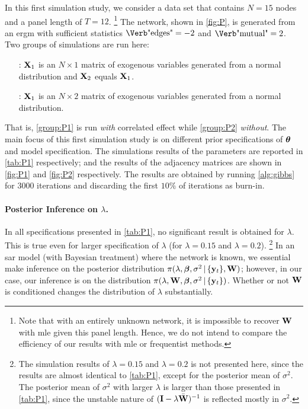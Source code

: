 \documentclass[a4paper]{article}
\begin{document}
In this first simulation study,
we consider a data set that contains $N=15$ nodes and a panel length of $T=12$.
\footnote{
	Note that with an entirely unknown network,
	it is impossible to recover $\mathbf{W}$ with \gls{mle} given this panel length.
	Hence, we do not intend to compare the efficiency of our results with \gls{mle} or frequentist methods.
}
The network, shown in \autoref{fig:P},
is generated from an \gls{ergm}
with sufficient statistics $\text{\Verb"edges"}=-2$ and $\text{\Verb"mutual"}=2$.
Two groups of simulations are run here:
\begin{itemize}[leftmargin=]
	\item[\itemlabel{group:P1}{Group P1}:]
		$\mathbf{X}_1$ is an $N\times 1$ matrix of exogenous variables generated from a normal distribution and $\mathbf{X}_{2}$ equals $\mathbf{X}_{1}$.
	\item[\itemlabel{group:P2}{Group P2}:]
		$\mathbf{X}_1$ is an $N\times 2$ matrix of exogenous variables generated from a normal distribution.
\end{itemize}
That is, \ref{group:P1} is run \emph{with} correlated effect while \ref{group:P2} \emph{without}.
The main focus of this first simulation study is on different prior specifications of $\boldsymbol{\theta}$ and model specification.
The simulations results of the parameters are reported in \autoref{tab:P1} respectively;
and the results of the adjacency matrices are shown in \autoref{fig:P1} and \autoref{fig:P2} respectively.
The results are obtained by running \autoref{alg:gibbs} for $3000$ iterations and discarding the first $10\%$ of iterations as burn-in.

\paragraph{Posterior Inference on $\lambda$.}

In all specifications presented in \autoref{tab:P1},
no significant result is obtained for $\lambda$.
This is true even for larger specification of $\lambda$ (for $\lambda=0.15$ and $\lambda=0.2$).
\footnote{
	The simulation results of $\lambda=0.15$ and $\lambda=0.2$ is not presented here,
	since the results are almost identical to \autoref{tab:P1},
	except for the posterior mean of $\sigma^2$.
	The posterior mean of $\sigma^2$ with larger $\lambda$ is larger than those presented in \autoref{tab:P1},
	since the unstable nature of $(\mathbf{I}-\lambda\bar{\mathbf{W}})^{-1}$ is reflected mostly in $\sigma^2$.
}
In an \gls{sar} model (with Bayesian treatment) where the network is known,
we essential make inference on the posterior distribution $\pi(\lambda,\boldsymbol{\beta},\sigma^2\,|\,\{\mathbf{y}_{t}\},\mathbf{W})$;
however, in our case, our inference is on the distribution $\pi(\lambda,\mathbf{W},\boldsymbol{\beta},\sigma^2\,|\,\{\mathbf{y}_{t}\})$.
Whether or not $\mathbf{W}$ is conditioned changes the distribution of $\lambda$ substantially.
\end{document}
